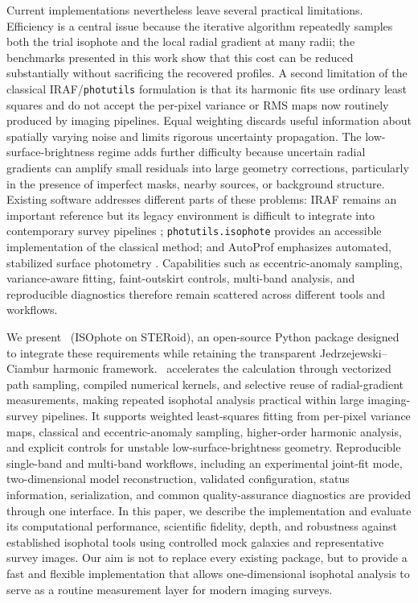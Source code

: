 Current implementations nevertheless leave several practical limitations.
Efficiency is a central issue because the iterative algorithm repeatedly
samples both the trial isophote and the local radial gradient at many radii;
the benchmarks presented in this work show that this cost can be reduced
substantially without sacrificing the recovered profiles. A second limitation
of the classical IRAF/\texttt{photutils} formulation is that its harmonic fits
use ordinary least squares and do not accept the per-pixel variance or RMS maps
now routinely produced by imaging pipelines. Equal weighting discards useful
information about spatially varying noise and limits rigorous uncertainty
propagation. The low-surface-brightness regime adds further difficulty because
uncertain radial gradients can amplify small residuals into large geometry
corrections, particularly in the presence of imperfect masks, nearby sources,
or background structure. Existing software addresses different parts of
these problems: IRAF remains an important reference but its legacy environment
is difficult to integrate into contemporary survey pipelines \citep{Tody1986};
\texttt{photutils.isophote} provides an accessible implementation of the
classical method; and AutoProf emphasizes automated, stabilized surface
photometry \citep{Stone2021}. Capabilities such as eccentric-anomaly sampling,
variance-aware fitting, faint-outskirt controls, multi-band analysis, and
reproducible diagnostics therefore remain scattered across different tools
and workflows.

We present \isoster\ (ISOphote on STERoid), an open-source Python package
designed to integrate these requirements while retaining the transparent
Jedrzejewski--Ciambur harmonic framework. \isoster\ accelerates the calculation
through vectorized path sampling, compiled numerical kernels, and selective
reuse of radial-gradient measurements, making repeated isophotal analysis
practical within large imaging-survey pipelines. It supports weighted
least-squares fitting from per-pixel variance maps, classical and
eccentric-anomaly sampling, higher-order harmonic analysis, and explicit
controls for unstable low-surface-brightness geometry. Reproducible
single-band and multi-band workflows, including an experimental joint-fit
mode, two-dimensional model reconstruction, validated configuration, status
information, serialization, and common quality-assurance diagnostics are
provided through one interface. In this paper, we describe the implementation
and evaluate its computational performance, scientific fidelity, depth, and
robustness against established isophotal tools using controlled mock galaxies
and representative survey images. Our aim is not to replace every existing
package, but to provide a fast and flexible implementation that allows
one-dimensional isophotal analysis to serve as a routine measurement layer for
modern imaging surveys.

